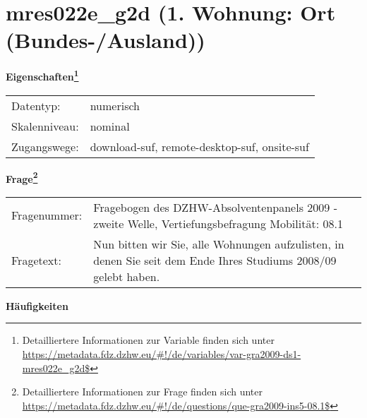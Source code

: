 
    \setcounter{footnote}{0}

    \vspace*{-1.8cm}
	\section{mres022e\_g2d (1. Wohnung: Ort (Bundes-/Ausland))}
	\label{section:mres022e_g2d}



    \vspace*{0.5cm}
    \noindent\textbf{Eigenschaften\footnote{Detailliertere Informationen zur Variable finden sich unter
		\url{https://metadata.fdz.dzhw.eu/\#!/de/variables/var-gra2009-ds1-mres022e_g2d$}}}\\
	\begin{tabularx}{\hsize}{@{}lX}
	Datentyp: & numerisch \\
	Skalenniveau: & nominal \\
	Zugangswege: &
	  download-suf, 
	  remote-desktop-suf, 
	  onsite-suf
 \\
    \end{tabularx}



				\vspace*{0.5cm}
                \noindent\textbf{Frage\footnote{Detailliertere Informationen zur Frage finden sich unter
		              \url{https://metadata.fdz.dzhw.eu/\#!/de/questions/que-gra2009-ins5-08.1$}}}\\
				\begin{tabularx}{\hsize}{@{}lX}
					Fragenummer: &
					  Fragebogen des DZHW-Absolventenpanels 2009 - zweite Welle, Vertiefungsbefragung Mobilität:
					  08.1
 \\
					Fragetext: & Nun bitten wir Sie, alle Wohnungen aufzulisten, in denen Sie seit dem Ende Ihres Studiums 2008/09 gelebt haben. \\
				\end{tabularx}





        		\vspace*{0.5cm}
                \noindent\textbf{Häufigkeiten}

